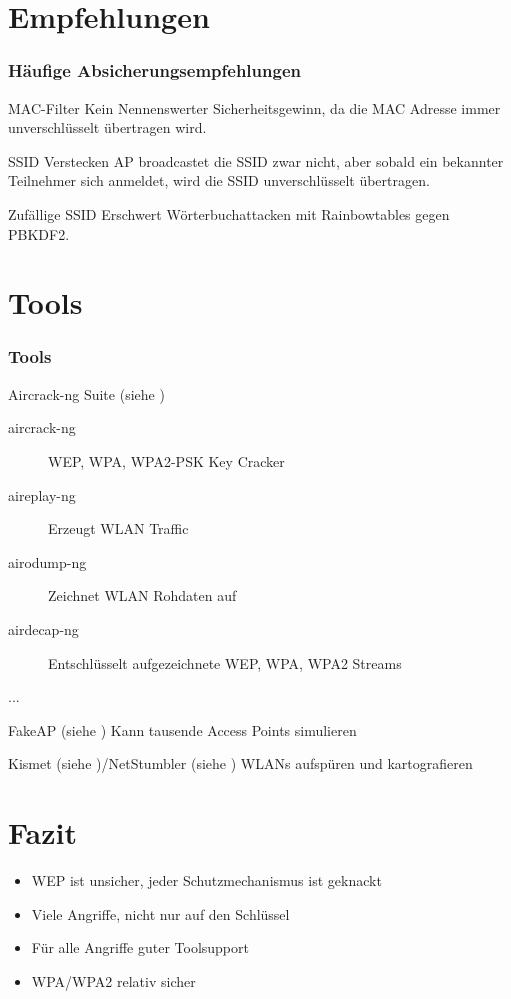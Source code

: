 \documentclass{beamer}
\begin{document}
\section{Empfehlungen}
\begin{frame}
\frametitle{Häufige Absicherungsempfehlungen}
\begin{block}{MAC-Filter}
Kein Nennenswerter Sicherheitsgewinn, da die MAC Adresse immer unverschlüsselt übertragen wird.
\end{block}
\begin{block}{SSID Verstecken}
AP broadcastet die SSID zwar nicht, aber sobald ein bekannter Teilnehmer sich anmeldet, wird die SSID unverschlüsselt übertragen.
\end{block} 
\begin{block}{Zufällige SSID}
Erschwert Wörterbuchattacken mit Rainbowtables gegen PBKDF2.
\end{block}
\end{frame}

\section{Tools}
\begin{frame}
\frametitle{Tools}
\begin{block}{Aircrack-ng Suite (siehe \cite{aircrack})}
	\begin{description}
		\item[aircrack-ng] WEP, WPA, WPA2-PSK Key Cracker
		\item[aireplay-ng] Erzeugt WLAN Traffic
		\item[airodump-ng] Zeichnet WLAN Rohdaten auf
		\item[airdecap-ng] Entschlüsselt aufgezeichnete WEP, WPA, WPA2 Streams
		\item[...]
	\end{description}
\end{block}
\begin{block}{FakeAP (siehe \cite{fakeap})}
Kann tausende Access Points simulieren
\end{block}
\begin{block}{Kismet (siehe \cite{kismet})/NetStumbler (siehe \cite{netstumbler})}
WLANs aufspüren und kartografieren
\end{block}
\end{frame}

\section{Fazit}
\begin{frame}
\begin{itemize}
\frametitle{Fazit}
	\item WEP ist unsicher, jeder Schutzmechanismus ist geknackt
	\item Viele Angriffe, nicht nur auf den Schlüssel
	\item Für alle Angriffe guter Toolsupport
	\item WPA/WPA2 relativ sicher
\end{itemize}
\end{frame}
\end{document}
